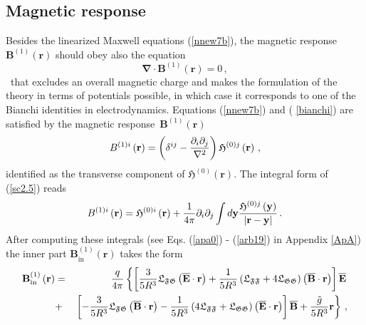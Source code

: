 \documentclass[12pt]{article}
\begin{document}
\subsection{Magnetic response\label{Ss3.1}}

Besides the linearized Maxwell equations (\ref{nnew7b}), the magnetic
response $\mathbf{B}^{\left( 1\right) }\left( \mathbf{r}\right) $ should
obey also the equation%
\begin{equation}
\boldsymbol{\nabla }\cdot \mathbf{B}^{\left( 1\right) }\left( \mathbf{r}%
\right) =0\,,  \label{bianchi}
\end{equation}%
\ that excludes an overall magnetic charge and makes the formulation of the
theory in terms of potentials possible, in which case it corresponds to one
of the Bianchi identities in electrodynamics. Equations (\ref{nnew7b}) and (%
\ref{bianchi}) are satisfied by the magnetic response\ $\mathbf{B}^{\left(
1\right) }\left( \mathbf{r}\right) $%
\begin{equation}
B^{\left( 1\right) i}\left( \mathbf{r}\right) =\left( \delta ^{ij}-\frac{%
\partial _{i}\partial _{j}}{\mathbf{\nabla }^{2}}\right) \mathfrak{H}%
^{\left( 0\right) j}\left( \mathbf{r}\right) \,,  \label{sc2.5}
\end{equation}%
identified as the transverse component of $\mathbf{\mathfrak{H}}^{\left(
0\right) }\left( \mathbf{r}\right) $. The integral form of (\ref{sc2.5})
reads%
\begin{equation}
B^{\left( 1\right) i}\left( \mathbf{r}\right) =\mathfrak{H}^{\left( 0\right)
i}\left( \mathbf{r}\right) +\frac{1}{4\pi }\partial _{i}\partial _{j}\int d%
\mathbf{y}\frac{\mathfrak{H}^{\left( 0\right) j}\left( \mathbf{y}\right) }{%
\left\vert \mathbf{r-y}\right\vert }\,.  \label{sc2.5b}
\end{equation}%
After computing these integrals (see Eqs. (\ref{apa0}) - (\ref{arb19}) in
Appendix \ref{ApA}) the inner part $\mathbf{B}_{\mathrm{in}}^{\left(
1\right) }\left( \mathbf{r}\right) $ takes the form%
\begin{eqnarray}
\mathbf{B}_{\mathrm{in}}^{\left( 1\right) }\left( \mathbf{r}\right)  &=&%
\frac{q}{4\pi }\left\{ \left[ \frac{3}{5R^{3}}\mathfrak{L}_{\mathfrak{FG}%
}\left( \overline{\mathbf{E}}\cdot \mathbf{r}\right) +\frac{1}{5R^{3}}\left( 
\mathfrak{L}_{\mathfrak{FF}}+4\mathfrak{L}_{\mathfrak{GG}}\right) \left( 
\mathbf{\overline{B}}\cdot \mathbf{r}\right) \right] \overline{\mathbf{E}}%
\right.   \notag \\
&+&\left. \left[ -\frac{3}{5R^{3}}\mathfrak{L}_{\mathfrak{FG}}\left( \mathbf{%
\overline{B}}\cdot \mathbf{r}\right) -\frac{1}{5R^{3}}\left( 4\mathfrak{L}_{%
\mathfrak{FF}}+\mathfrak{L}_{\mathfrak{GG}}\right) \left( \overline{\mathbf{E%
}}\cdot \mathbf{r}\right) \right] \mathbf{\overline{B}}+\frac{\tilde{g}}{%
5R^{3}}\mathbf{r}\right\} \,,  \label{arb21}
\end{eqnarray}%
\end{document}
